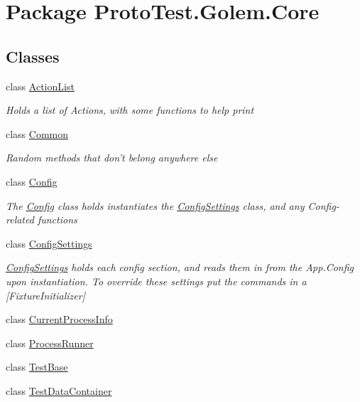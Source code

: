 \hypertarget{namespace_proto_test_1_1_golem_1_1_core}{\section{Package Proto\-Test.\-Golem.\-Core}
\label{namespace_proto_test_1_1_golem_1_1_core}
}
\subsection*{Classes}
\begin{DoxyCompactItemize}
\item 
class \hyperlink{class_proto_test_1_1_golem_1_1_core_1_1_action_list}{Action\-List}
\begin{DoxyCompactList}\small\item\em Holds a list of Actions, with some functions to help print \end{DoxyCompactList}\item 
class \hyperlink{class_proto_test_1_1_golem_1_1_core_1_1_common}{Common}
\begin{DoxyCompactList}\small\item\em Random methods that don't belong anywhere else \end{DoxyCompactList}\item 
class \hyperlink{class_proto_test_1_1_golem_1_1_core_1_1_config}{Config}
\begin{DoxyCompactList}\small\item\em The \hyperlink{class_proto_test_1_1_golem_1_1_core_1_1_config}{Config} class holds instantiates the \hyperlink{class_proto_test_1_1_golem_1_1_core_1_1_config_settings}{Config\-Settings} class, and any Config-\/related functions \end{DoxyCompactList}\item 
class \hyperlink{class_proto_test_1_1_golem_1_1_core_1_1_config_settings}{Config\-Settings}
\begin{DoxyCompactList}\small\item\em \hyperlink{class_proto_test_1_1_golem_1_1_core_1_1_config_settings}{Config\-Settings} holds each config section, and reads them in from the App.\-Config upon instantiation. To override these settings put the commands in a \mbox{[}Fixture\-Initializer\mbox{]} \end{DoxyCompactList}\item 
class \hyperlink{class_proto_test_1_1_golem_1_1_core_1_1_current_process_info}{Current\-Process\-Info}
\item 
class \hyperlink{class_proto_test_1_1_golem_1_1_core_1_1_process_runner}{Process\-Runner}
\item 
class \hyperlink{class_proto_test_1_1_golem_1_1_core_1_1_test_base}{Test\-Base}
\item 
class \hyperlink{class_proto_test_1_1_golem_1_1_core_1_1_test_data_container}{Test\-Data\-Container}
\end{DoxyCompactItemize}
